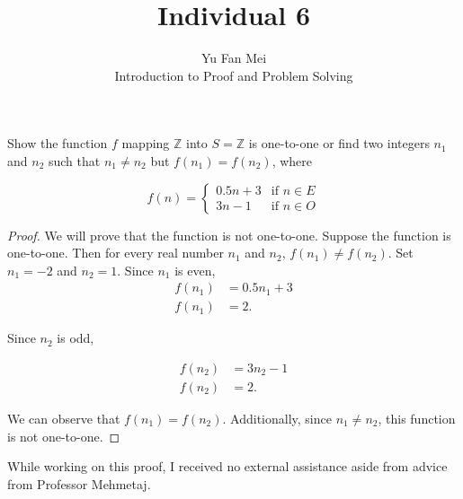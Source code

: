 \documentclass[12pt]{article}
\newenvironment{problem}[2][Problem]{\begin{trivlist}
\item[\hskip \labelsep {\bfseries #1}\hskip \labelsep {\bfseries #2.}]}{\end{trivlist}}
\begin{document}

\title{Individual 6}%
\author{Yu Fan Mei\\ %
	Introduction to Proof and Problem Solving} %

\maketitle

\begin{problem}{12} %
    Show the function $f$ mapping $\mathbb{Z}$ into $S = \mathbb{Z} $ is one-to-one or find two integers $n_1$ and $n_2$ such that $n_1 \neq n_2$ but $f(n_1) = f(n_2)$, where

    $$f(n) = 
        \begin{cases} 
        0.5n + 3 & \text{if } n \in E \\ 
        3n - 1 & \text{if } n \in O 
        \end{cases}$$


    
    

\end{problem}

\begin{proof} We will prove that the function is not one-to-one. Suppose the function is one-to-one. Then for every real number $n_1$ and $n_2$, $f(n_1) \neq f(n_2)$. Set $n_1 = -2$ and $n_2 = 1$. Since $n_1$ is even, 
    \begin{align*}
        f(n_1) & = 0.5n_1 + 3 \\
        f(n_1) & = 2.
    \end{align*}
    
    Since $n_2$ is odd,

    \begin{align*} 
        f(n_2) & = 3n_2 - 1 \\
        f(n_2) & = 2.
    \end{align*}

    We can observe that $f(n_1) = f(n_2)$. Additionally, since $n_1 \neq n_2$, this function is not one-to-one.


\end{proof}


\noindent While working on this proof, I received no external assistance aside from advice from Professor Mehmetaj.
\end{document}
